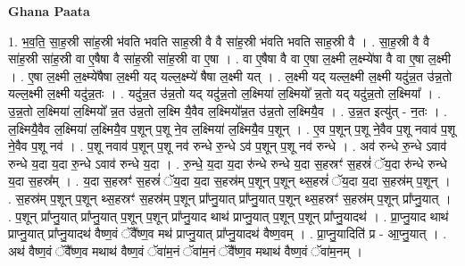 \documentclass[17pt]{extarticle}
\begin{document}
\textbf{Ghana Paata } \newline

1. भ॒व॒ति॒ सा॒ह॒स्री सा॑ह॒स्री भ॑वति भवति साह॒स्री वै वै सा॑ह॒स्री भ॑वति भवति साह॒स्री वै । . सा॒ह॒स्री वै वै सा॑ह॒स्री सा॑ह॒स्री वा ए॒षैषा वै सा॑ह॒स्री सा॑ह॒स्री वा ए॒षा । . वा ए॒षैषा वै वा ए॒षा ल॒क्ष्मी ल॒क्ष्म्ये॑षा वै वा ए॒षा ल॒क्ष्मी । . ए॒षा ल॒क्ष्मी ल॒क्ष्म्ये॑षैषा ल॒क्ष्मी यद् यल्ल॒क्ष्म्ये॑ षैषा ल॒क्ष्मी यत् । . ल॒क्ष्मी यद् यल्ल॒क्ष्मी ल॒क्ष्मी यदु॑न्न॒त उ॑न्न॒तो यल्ल॒क्ष्मी ल॒क्ष्मी यदु॑न्न॒तः । . यदु॑न्न॒त उ॑न्न॒तो यद् यदु॑न्न॒तो ल॒क्ष्मिया॑ ल॒क्ष्मियो᳚ न्न॒तो यद् यदु॑न्न॒तो ल॒क्ष्मिया᳚ । . उ॒न्न॒तो ल॒क्ष्मिया॑ ल॒क्ष्मियो᳚ न्न॒त उ॑न्न॒तो ल॒क्ष्मि यै॒वैव ल॒क्ष्मियो᳚न्न॒त उ॑न्न॒तो ल॒क्ष्मियै॒व । . उ॒न्न॒त इत्यु॑त् - न॒तः । . ल॒क्ष्मियै॒वैव ल॒क्ष्मिया॑ ल॒क्ष्मियै॒व प॒शून् प॒शू ने॒व ल॒क्ष्मिया॑ ल॒क्ष्मियै॒व प॒शून् । . ए॒व प॒शून् प॒शू ने॒वैव प॒शू नवाव॑ प॒शू ने॒वैव प॒शू नव॑ । . प॒शू नवाव॑ प॒शून् प॒शू नव॑ रुन्धे रु॒न्धे ऽव॑ प॒शून् प॒शू नव॑ रुन्धे । . अव॑ रुन्धे रु॒न्धे ऽवाव॑ रुन्धे य॒दा य॒दा रु॒न्धे ऽवाव॑ रुन्धे य॒दा । . रु॒न्धे॒ य॒दा य॒दा रु॑न्धे रुन्धे य॒दा स॒हस्रꣳ॑ स॒हस्रं॑ ॅय॒दा रु॑न्धे रुन्धे य॒दा स॒हस्र᳚म् । . य॒दा स॒हस्रꣳ॑ स॒हस्रं॑ ॅय॒दा य॒दा स॒हस्र॑म् प॒शून् प॒शून् थ्स॒हस्रं॑ ॅय॒दा य॒दा स॒हस्र॑म् प॒शून् । . स॒हस्र॑म् प॒शून् प॒शून् थ्स॒हस्रꣳ॑ स॒हस्र॑म् प॒शून् प्रा᳚प्नु॒यात् प्रा᳚प्नु॒यात् प॒शून् थ्स॒हस्रꣳ॑ स॒हस्र॑म् प॒शून् प्रा᳚प्नु॒यात् । . प॒शून् प्रा᳚प्नु॒यात् प्रा᳚प्नु॒यात् प॒शून् प॒शून् प्रा᳚प्नु॒याद थाथ॑ प्राप्नु॒यात् प॒शून् प॒शून् प्रा᳚प्नु॒यादथ॑ । . प्रा॒प्नु॒याद थाथ॑ प्राप्नु॒यात् प्रा᳚प्नु॒यादथ॑ वैष्ण॒वं ॅवै᳚ष्ण॒व मथ॑ प्राप्नु॒यात् प्रा᳚प्नु॒यादथ॑ वैष्ण॒वम् । . प्रा॒प्नु॒यादिति॑ प्र - आ॒प्नु॒यात् । . अथ॑ वैष्ण॒वं ॅवै᳚ष्ण॒व मथाथ॑ वैष्ण॒वं ॅवा॑म॒नं ॅवा॑म॒नं ॅवै᳚ष्ण॒व मथाथ॑ वैष्ण॒वं ॅवा॑म॒नम् । \newline
\end{document}
